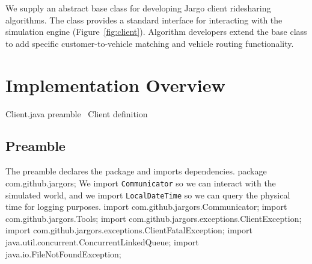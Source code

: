 We supply an abstract base class for developing Jargo client ridesharing
algorithms. The class provides a standard interface for interacting with the
simulation engine (Figure~\ref{fig:client}). Algorithm developers extend the
base class to add specific customer-to-vehicle matching and vehicle routing
functionality.

\section{Implementation Overview}
\endmoddef{}
\LA{}Client.java preamble~{\nwtagstyle{}}\RA{}
\LA{}\code{}Client\edoc{} definition~{\nwtagstyle{}}\RA{}
\nwendcode{}\nwdocspar

\subsection{Preamble}
The preamble declares the package and imports dependencies.
\nwenddocs{}\endmoddef{}
package com.github.jargors;
\nwendcode{}\nwdocspar
We import {\tt{}Communicator} so we can interact with the simulated world,
and we import {\tt{}LocalDateTime} so we can query the physical time for
logging purposes.
\nwenddocs{}\plusendmoddef
import com.github.jargors.Communicator;
import com.github.jargors.Tools;
import com.github.jargors.exceptions.ClientException;
import com.github.jargors.exceptions.ClientFatalException;
import java.util.concurrent.ConcurrentLinkedQueue;
import java.io.FileNotFoundException;
\nwendcode{}\nwdocspar


